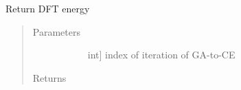 \documentclass[letterpaper,10pt,english]{sphinxmanual}
\begin{document}
\begin{fulllineitems}
\begin{fulllineitems}
\begin{quote}
\begin{description}
\end{description}\end{quote}

\end{fulllineitems}


\begin{fulllineitems}
\label{\detokenize{pygace.examples.hfo2:pygace.examples.hfo2.hfo2_gace.HfO2EleIndv.dft_energy_deprecated}}
Return DFT energy
\begin{quote}\begin{description}
\item[{Parameters}] \leavevmode\begin{description}
\item[{}] \leavevmode{[}int{]}
index of iteration of GA-to-CE

\end{description}

\item[{Returns}] \leavevmode\begin{description}
\item[{}] \leavevmode
\end{description}

\end{description}\end{quote}

\end{fulllineitems}


\end{fulllineitems}

\end{document}
